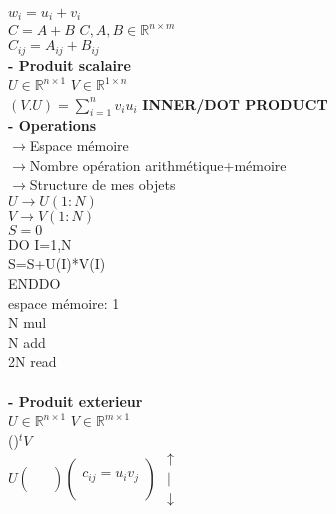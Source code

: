 \documentclass{article}
\begin{document}
    $w_i=u_i+v_i$\\
    $C=A+B$ $C,A,B \in \mathbb{R}^{n \times m}$\\
    $C_{ij}=A_{ij}+B_{ij}$\\
    \textbf{- Produit scalaire}\\
    $U \in \mathbb{R}^{n \times 1}$
    $V \in \mathbb{R}^{1 \times n}$\\
    $(V.U)=\sum_{i=1}^n v_iu_i$
    \textbf{INNER/DOT PRODUCT}\\
    \textbf{- Operations}\\
    $\to$Espace mémoire\\
    $\to$Nombre opération arithmétique+mémoire\\
    $\to$Structure de mes objets\\
    $U \to U(1:N)$\\
    $V \to V(1:N)$\\
    $S=0$\\
    DO I=1,N\\
    \hspace*{0.6cm}S=S+U(I)*V(I)\\
    ENDDO\\
    espace mémoire: 1\\
    N mul\\
    N add\\
    2N read\\\\
    \textbf{- Produit exterieur}\\
    $U \in \mathbb{R}^{n \times 1}$
    $V \in \mathbb{R}^{m \times 1}$\\
    \hspace*{1.5cm}(\hspace*{1.5cm})$^tV$\\
    $U
    \begin{pmatrix}
        \\&\\&\\
    \end{pmatrix}
    \begin{pmatrix}
        \\
        c_{ij}=u_iv_j\\
        \\
    \end{pmatrix}$
    $\begin{matrix}
        \uparrow\\
        |\\
        \downarrow
    \end{matrix}$
\end{document}
